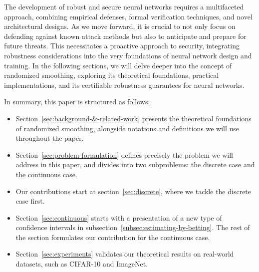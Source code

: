 The development of robust and secure neural networks requires a multifaceted approach, combining empirical defenses, formal verification techniques, and novel architectural designs.
As we move forward, it is crucial to not only focus on defending against known attack methods but also to anticipate and prepare for future threats.
This necessitates a proactive approach to security, integrating robustness considerations into the very foundations of neural network design and training.
In the following sections, we will delve deeper into the concept of randomized smoothing, exploring its theoretical foundations, practical implementations, and its certifiable robustness guarantees for neural networks.

In summary, this paper is structured as follows:
\begin{itemize}
    \item Section~\ref{sec:background-&-related-work} presents the theoretical foundations of randomized smoothing, alongside notations and definitions we will use throughout the paper.
    \item Section~\ref{sec:problem-formulation} defines precisely the problem we will address in this paper, and divides into two subproblems: the discrete case and the continuous case.
    \item Our contributions start at section~\ref{sec:discrete}, where we tackle the discrete case first.
    \item Section~\ref{sec:continuous} starts with a presentation of a new type of confidence intervals in subsection~\ref{subsec:estimating-by-betting}.
    The rest of the section formulates our contribution for the continuous case.
    \item Section~\ref{sec:experiments} validates our theoretical results on real-world datasets, such as CIFAR-10 and ImageNet.
\end{itemize}